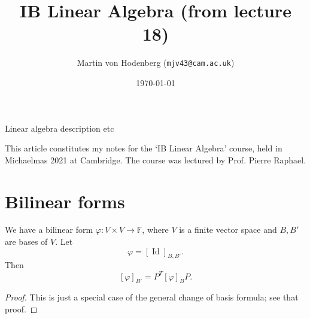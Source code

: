 \documentclass[a4paper]{scrartcl}
\title{IB Linear Algebra (from lecture 18)}
\author{Martin von Hodenberg (\texttt{mjv43@cam.ac.uk})}
\date{\today}
\begin{document}
\maketitle

Linear algebra description etc

This article constitutes my notes for the `IB Linear Algebra' course, held in Michaelmas 2021 at Cambridge. The course was lectured by Prof. Pierre Raphael.


\tableofcontents

\section{Bilinear forms}
\begin{lemma}
    We have a bilinear form $\varphi: V \times V \rightarrow \mathbb{F}$, where $V$ is a finite vector space and $B, B'$ are bases of $V$. Let 
    \[\varphi=[\operatorname{Id}]_{B,B'}.\]
     Then 
    \[[\varphi]_{B'}=P^T [\varphi]_B P.\]
\end{lemma}
\begin{proof}
     This is just a special case of the general change of basis formula; see that proof.
\end{proof}
\end{document}
